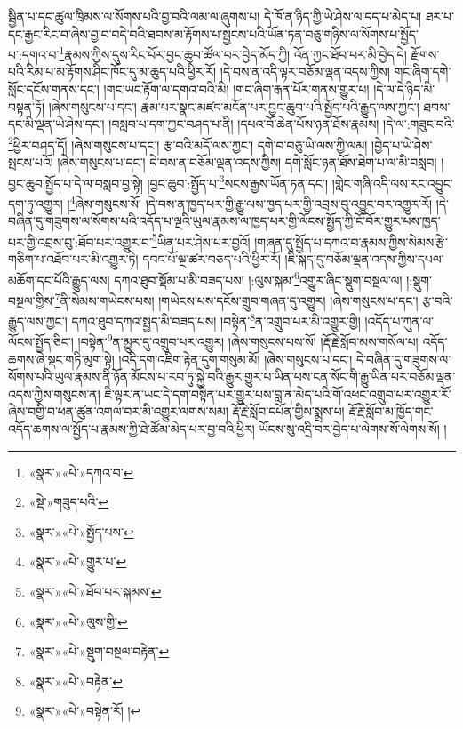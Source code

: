 སྦྱིན་པ་དང་ཚུལ་ཁྲིམས་ལ་སོགས་པའི་བྱ་བའི་ལམ་ལ་ཞུགས་པ། དེ་ཁོ་ན་ཉིད་ཀྱི་ཡེ་ཤེས་ལ་དད་པ་མེད་པ། ཐར་པ་དང་རྒྱང་རིང་བ་ཞེས་བྱ་བ་བདེ་བའི་ཐབས་མ་རྟོགས་པ་སྦྱངས་པའི་ཡོན་ཏན་བཅུ་གཉིས་ལ་སོགས་པ་སྤྱོད་པ་:དགའ་བ་\footnote{«སྣར་»«པེ་»དཀའ་བ་}རྣམས་ཀྱིས་དུས་རིང་པོར་བྱང་ཆུབ་ཚོལ་བར་བྱེད་མོད་ཀྱི། འོན་ཀྱང་ཐོབ་པར་མི་བྱེད་དེ། རྫོགས་པའི་རིམ་པ་མ་རྟོགས་ཤིང་ཁོང་དུ་མ་ཆུད་པའི་ཕྱིར་རོ། །དེ་བས་ན་འདི་ལྟར་བཅོམ་ལྡན་འདས་ཀྱིས། གང་ཞིག་དགེ་སློང་དངོས་གནས་དང་། །གང་ཡང་རྟོག་ལ་དགའ་བའི་མི། །གང་ཞིག་རྒན་པོར་གནས་གྱུར་པ། །དེ་ལ་དེ་ཉིད་མི་བསྟན་ཏོ། །ཞེས་གསུངས་པ་དང་། རྣམ་པར་སྣང་མཛད་མངོན་པར་བྱང་ཆུབ་པའི་སྤྱོད་པའི་རྒྱུད་ལས་ཀྱང་། ཐབས་དང་མི་ལྡན་ཡེ་ཤེས་དང་། །བསླབ་པ་དག་ཀྱང་བཤད་པ་ནི། །དཔའ་བོ་ཆེན་པོས་ཉན་ཐོས་རྣམས། །དེ་ལ་:གཟུང་བའི་\footnote{«སྡེ་»གཟུད་པའི་}ཕྱིར་བཤད་དོ། །ཞེས་གསུངས་པ་དང་། རྩ་བའི་མདོ་ལས་ཀྱང་། དགེ་བ་བཅུ་ཡི་ལས་ཀྱི་ལམ། །བྱེད་པ་ཡེ་ཤེས་སྤངས་པའོ། །ཞེས་གསུངས་པ་དང་། དེ་བས་ན་བཅོམ་ལྡན་འདས་ཀྱིས། དགེ་སློང་ཉན་ཐོས་ཐེག་པ་ལ་མི་བསླབ། །བྱང་ཆུབ་སྤྱོད་པ་དེ་ལ་བསླབ་བྱ་སྟེ། །བྱང་ཆུབ་:སྤྱོད་པ་\footnote{«སྣར་»«པེ་»སྤྱོད་པས་}སངས་རྒྱས་ཡོན་ཏན་དང་། །གླེང་གཞི་འདི་ལས་རང་འབྱུང་དག་ཏུ་འགྱུར། །\footnote{«སྣར་»«པེ་»གྱུར་པ་}ཞེས་གསུངས་སོ། །དེ་བས་ན་ཁྱད་པར་གྱི་རྒྱུ་ལས་ཁྱད་པར་གྱི་འབྲས་བུ་འབྱུང་བར་འགྱུར་རོ། །དེ་བཞིན་དུ་གཟུགས་ལ་སོགས་པའི་འདོད་པ་ལྔའི་ཡུལ་རྣམས་ལ་ཁྱད་པར་གྱི་ལོངས་སྤྱོད་ཀྱི་ངོ་བོར་གྱུར་པས་ཁྱད་པར་གྱི་འབྲས་བུ་:ཐོབ་པར་འགྱུར་བ་\footnote{«སྣར་»«པེ་»ཐོབ་པར་སྐམས་}ཡིན་པར་ཤེས་པར་བྱའོ། །གཞན་དུ་སྤྱོད་པ་དཀའ་བ་རྣམས་ཀྱིས་སེམས་རྩེ་གཅིག་པ་འཐོབ་པར་མི་འགྱུར་ཏེ། དབང་པོ་ལྔ་ཚར་བཅད་པའི་ཕྱིར་རོ། །ཇི་སྐད་དུ་བཅོམ་ལྡན་འདས་ཀྱིས་དཔལ་མཆོག་དང་པོའི་རྒྱུད་ལས། དཀའ་ཐུབ་སྡོམ་པ་མི་བཟད་པས། །:ལུས་སྐམ་\footnote{«སྣར་»«པེ་»ལུས་གྱི་}འགྱུར་ཞིང་སྡུག་བསྔལ་ལ། །:སྡུག་བསྔལ་གྱིས་\footnote{«སྣར་»«པེ་»སྡུག་བསྔལ་བརྟེན་}ནི་སེམས་གཡེངས་པས། །གཡེངས་པས་དངོས་གྲུབ་གཞན་དུ་འགྱུར། །ཞེས་གསུངས་པ་དང་། རྩ་བའི་རྒྱུད་ལས་ཀྱང་། དཀའ་ཐུབ་དཀའ་སྤྱད་མི་བཟད་པས། །བསྟེན་\footnote{«སྣར་»«པེ་»བརྟེན་}ན་འགྲུབ་པར་མི་འགྱུར་གྱི། །འདོད་པ་ཀུན་ལ་ལོངས་སྤྱོད་ཅིང་། །བསྟེན་\footnote{«སྣར་»«པེ་»བསྟེན་རོ། །}ན་མྱུར་དུ་འགྲུབ་པར་འགྱུར། །ཞེས་གསུངས་པས་སོ། །རྡོ་རྗེ་སློབ་མས་གསོལ་པ། འདོད་ཆགས་ཞེ་སྡང་གཏི་མུག་སྟེ། །འདི་དག་འཇིག་རྟེན་དུག་གསུམ་མོ། །ཞེས་གསུངས་པ་དང་། དེ་བཞིན་དུ་གཟུགས་ལ་སོགས་པའི་ཡུལ་རྣམས་ནི་ཉོན་མོངས་པ་རབ་ཏུ་སྐྱེ་བའི་རྒྱུར་གྱུར་པ་ཡིན་པས་ངན་སོང་གི་རྒྱུ་ཡིན་པར་བཅོམ་ལྡན་འདས་ཀྱིས་གསུངས་ན། ཇི་ལྟར་ན་ཡང་དེ་དག་བསྟེན་པར་གྱུར་པས་བླ་ན་མེད་པའི་གོ་འཕང་འགྲུབ་པར་འགྱུར་རོ་ཞེས་བགྱི་བ་ཕན་ཚུན་འགལ་བར་མི་འགྱུར་ལགས་སམ། རྡོ་རྗེ་སློབ་དཔོན་གྱིས་སྨྲས་པ། རྡོ་རྗེ་སློབ་མ་ཁྱོད་གང་འདོད་ཆགས་ལ་སྤྱོད་པ་རྣམས་ཀྱི་ཐེ་ཚོམ་མེད་པར་བྱ་བའི་ཕྱིར། ཡོངས་སུ་འདྲི་བར་བྱེད་པ་ལེགས་སོ་ལེགས་སོ། །
